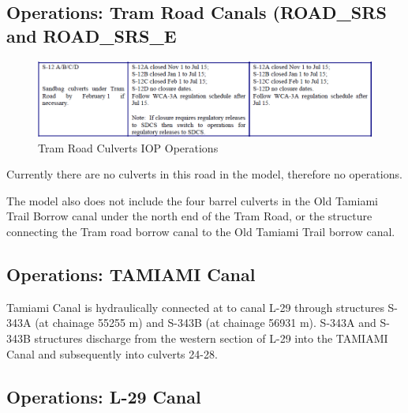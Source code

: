 \clearpage

\subsection{Operations: Tram Road Canals (ROAD\_SRS and ROAD\_SRS\_E}
\begin{figure}[!h]
  \begin{center}
  \includegraphics[width=6.5in]{../figs/S12s_IOPops.png}
  \caption{Tram Road Culverts IOP Operations}
  \label{fig:TRCiop}
  \end{center}
\end{figure}

Currently there are no culverts in this road in the model, therefore no operations.

The model also does not include the four barrel culverts in the Old Tamiami Trail Borrow canal under the north end of the Tram Road, or the structure connecting the Tram road borrow canal to the Old Tamiami Trail borrow canal.

\clearpage
\subsection{Operations: TAMIAMI Canal}

Tamiami Canal is hydraulically connected at  to canal L-29 through structures S-343A (at chainage 55255 m)  and S-343B (at chainage 56931 m). S-343A and S-343B structures discharge from the western section of L-29 into the TAMIAMI Canal and subsequently into culverts 24-28.

\subsection{Operations: L-29 Canal}

